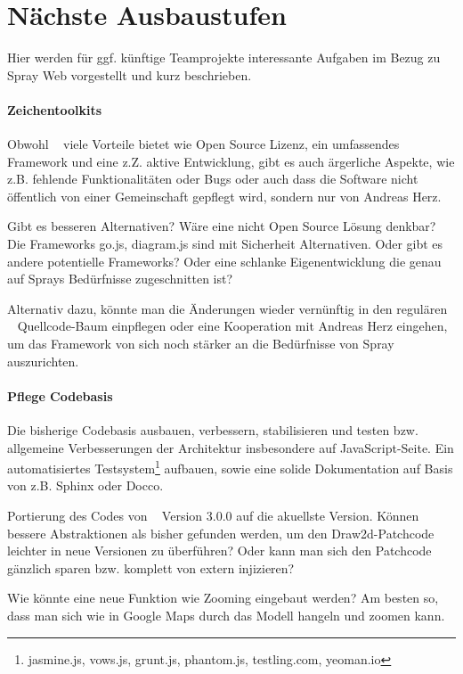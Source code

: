 \section{Nächste Ausbaustufen}

Hier werden für ggf. künftige Teamprojekte interessante Aufgaben
im Bezug zu Spray Web vorgestellt und kurz beschrieben.

\paragraph{Zeichentoolkits}

Obwohl \dd~ viele Vorteile bietet wie Open Source Lizenz, ein umfassendes
Framework und eine z.Z. aktive Entwicklung, gibt es auch ärgerliche Aspekte,
wie z.B. fehlende Funktionalitäten oder Bugs oder auch dass die Software
nicht öffentlich von einer Gemeinschaft gepflegt wird, sondern nur von
Andreas Herz.

Gibt es besseren Alternativen? Wäre eine nicht Open Source Lösung denkbar?
Die Frameworks go.js, diagram.js sind mit Sicherheit Alternativen. Oder gibt es andere potentielle
Frameworks? Oder eine schlanke Eigenentwicklung die genau auf Sprays
Bedürfnisse zugeschnitten ist?

Alternativ dazu, könnte man die Änderungen wieder vernünftig in den regulären
\dd~ Quellcode-Baum einpflegen oder eine Kooperation mit Andreas Herz eingehen,
um das Framework von sich noch stärker an die Bedürfnisse von Spray auszurichten.

\paragraph{Pflege Codebasis}

Die bisherige Codebasis ausbauen, verbessern, stabilisieren und testen bzw.
allgemeine Verbesserungen der Architektur insbesondere auf JavaScript-Seite.
Ein automatisiertes Testsystem\footnote{jasmine.js, vows.js, grunt.js,
phantom.js, testling.com, yeoman.io} aufbauen, sowie eine solide Dokumentation
auf Basis von z.B. Sphinx oder Docco.

Portierung des Codes von \dd~ Version 3.0.0 auf die akuellste Version.
Können bessere Abstraktionen als bisher gefunden werden, um den
Draw2d-Patchcode leichter in neue Versionen zu überführen?
Oder kann man sich den Patchcode gänzlich sparen bzw. komplett von extern
injizieren?

Wie könnte eine neue Funktion wie Zooming eingebaut werden? Am besten so,
dass man sich wie in Google Maps durch das Modell hangeln und zoomen kann.

